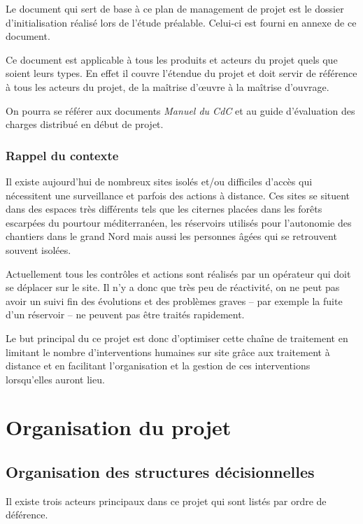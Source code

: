 \documentclass[a4paper, 11pt, draft]{report}
\begin{document}
Le document qui sert de base à ce plan de management de projet est le dossier d'initialisation réalisé lors de l'étude préalable. Celui-ci est fourni en annexe de ce document.

Ce document est applicable à tous les produits et acteurs du projet quels que soient leurs types. En effet il couvre l'étendue du projet et doit servir de référence à tous les acteurs du projet, de la maîtrise d'œuvre à la maîtrise d'ouvrage.

On pourra se référer aux documents \emph{Manuel du CdC} et au guide d'évaluation des charges distribué en début de projet.


\subsection{Rappel du contexte}

Il existe aujourd'hui de nombreux sites isolés et/ou difficiles d'accès qui nécessitent une surveillance et parfois des actions à distance. Ces sites se situent dans des espaces très différents tels que les citernes placées dans les forêts escarpées du pourtour méditerranéen, les réservoirs utilisés pour l'autonomie des chantiers dans le grand Nord mais aussi les personnes âgées qui se retrouvent souvent isolées.

Actuellement tous les contrôles et actions sont réalisés par un opérateur qui doit se déplacer sur le site. Il n'y a donc que très peu de réactivité, on ne peut pas avoir un suivi fin des évolutions et des problèmes graves -- par exemple la fuite d'un réservoir -- ne peuvent pas être traités rapidement.

Le but principal du ce projet est donc d'optimiser cette chaîne de traitement en limitant le nombre d'interventions humaines sur site grâce aux traitement à distance et en facilitant l'organisation et la gestion de ces interventions lorsqu'elles auront lieu.


\chapter{Organisation du projet}

\section{Organisation des structures décisionnelles}

Il existe trois acteurs principaux dans ce projet qui sont listés par ordre de déférence.
\end{document}
